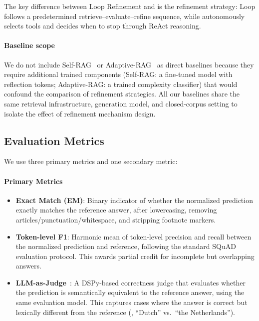 The key difference between Loop Refinement and \ours{} is the refinement strategy: Loop follows a predetermined retrieve--evaluate--refine sequence, while \ours{} autonomously selects tools and decides when to stop through ReAct reasoning.

\paragraph{Baseline scope}
We do not include Self-RAG~\cite{asai2024selfrag} or Adaptive-RAG~\cite{jeong2024adaptiverag} as direct baselines because they require additional trained components (Self-RAG: a fine-tuned model with reflection tokens; Adaptive-RAG: a trained complexity classifier) that would confound the comparison of refinement strategies.
All our baselines share the same retrieval infrastructure, generation model, and closed-corpus setting to isolate the effect of refinement mechanism design.

\subsection{Evaluation Metrics}
\label{subsec:metrics}

We use three primary metrics and one secondary metric:

\paragraph{Primary Metrics}

\begin{itemize}
    \item \textbf{Exact Match (EM)}: Binary indicator of whether the normalized prediction exactly matches the reference answer, after lowercasing, removing articles/punctuation/whitespace, and stripping footnote markers.

    \item \textbf{Token-level F1}: Harmonic mean of token-level precision and recall between the normalized prediction and reference, following the standard SQuAD evaluation protocol. This awards partial credit for incomplete but overlapping answers.

    \item \textbf{LLM-as-Judge}~\cite{zheng2023judging}: A DSPy-based correctness judge that evaluates whether the prediction is semantically equivalent to the reference answer, using the same evaluation model. This captures cases where the answer is correct but lexically different from the reference (\eg, ``Dutch'' vs.\ ``the Netherlands'').
\end{itemize}

